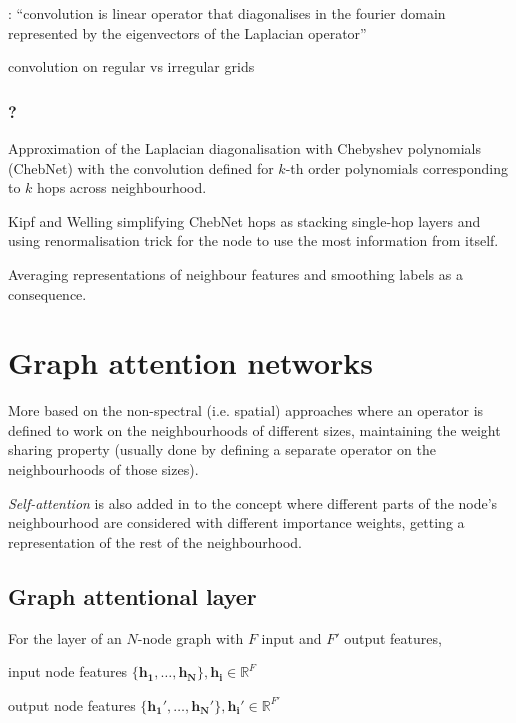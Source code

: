 \cite{defferrard2016convolutional}: ``convolution is linear operator that diagonalises in the fourier domain represented by the eigenvectors of the Laplacian operator''

convolution on regular vs irregular grids

\subsubsection{?}
Approximation of the Laplacian diagonalisation with Chebyshev polynomials (ChebNet) with the convolution defined for $k$-th order polynomials corresponding to $k$ hops across neighbourhood. \cite{defferrard2016convolutional}

Kipf and Welling simplifying ChebNet hops as stacking single-hop layers and using renormalisation trick for the node to use the most information from itself. \cite{kipf2017semi}


Averaging representations of neighbour features and smoothing labels as a consequence. \cite{wu2019simplifying}


\section{Graph attention networks}
\label{training-gat}
\cite{velickovic2018graph} More based on the non-spectral (i.e. spatial) approaches where an operator is defined to work on the neighbourhoods of different sizes, maintaining the weight sharing property (usually done by defining a separate operator on the neighbourhoods of those sizes).


\textit{Self-attention} is also added in to the concept where different parts of the node's neighbourhood are considered with different importance weights, getting a representation of the rest of the neighbourhood. 


\subsection{Graph attentional layer}
For the layer of an $N$-node graph with $F$ input and $F'$ output features, 

input node features $\{\mathbf{h_1}, \dots, \mathbf{h_N}\}, \mathbf{h_i} \in \mathbb{R}^F$

output node features $\{\mathbf{h_1'}, \dots, \mathbf{h_N'}\}, \mathbf{h_i'} \in \mathbb{R}^{F'}$

